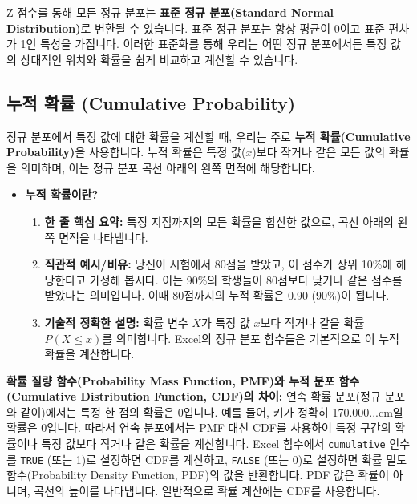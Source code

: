 \documentclass[11pt,a4paper]{book}
\theoremstyle{definition}
\begin{document}
Z-점수를 통해 모든 정규 분포는 \textbf{표준 정규 분포(Standard Normal Distribution)}로 변환될 수 있습니다.
표준 정규 분포는 항상 평균이 0이고 표준 편차가 1인 특성을 가집니다.
이러한 표준화를 통해 우리는 어떤 정규 분포에서든 특정 값의 상대적인 위치와 확률을 쉽게 비교하고 계산할 수 있습니다.

\subsection{누적 확률 (Cumulative Probability)}
정규 분포에서 특정 값에 대한 확률을 계산할 때, 우리는 주로 \textbf{누적 확률(Cumulative Probability)}을 사용합니다.
누적 확률은 특정 값($x$)보다 작거나 같은 모든 값의 확률을 의미하며, 이는 정규 분포 곡선 아래의 왼쪽 면적에 해당합니다.

\begin{itemize}
    \item \textbf{누적 확률이란?}
    \begin{enumerate}
        \item \textbf{한 줄 핵심 요약:} 특정 지점까지의 모든 확률을 합산한 값으로, 곡선 아래의 왼쪽 면적을 나타냅니다.
        \item \textbf{직관적 예시/비유:} 당신이 시험에서 80점을 받았고, 이 점수가 상위 10\%에 해당한다고 가정해 봅시다. 이는 90\%의 학생들이 80점보다 낮거나 같은 점수를 받았다는 의미입니다. 이때 80점까지의 누적 확률은 0.90 (90\%)이 됩니다.
        \item \textbf{기술적 정확한 설명:} 확률 변수 $X$가 특정 값 $x$보다 작거나 같을 확률 $P(X \le x)$를 의미합니다. Excel의 정규 분포 함수들은 기본적으로 이 누적 확률을 계산합니다.
    \end{enumerate}
\end{itemize}

\begin{cautionbox}
    \textbf{확률 질량 함수(Probability Mass Function, PMF)와 누적 분포 함수(Cumulative Distribution Function, CDF)의 차이:}
    연속 확률 분포(정규 분포와 같이)에서는 특정 한 점의 확률은 0입니다. 예를 들어, 키가 정확히 170.000...cm일 확률은 0입니다. 따라서 연속 분포에서는 PMF 대신 CDF를 사용하여 특정 구간의 확률이나 특정 값보다 작거나 같은 확률을 계산합니다. Excel 함수에서 \texttt{cumulative} 인수를 \texttt{TRUE} (또는 1)로 설정하면 CDF를 계산하고, \texttt{FALSE} (또는 0)로 설정하면 확률 밀도 함수(Probability Density Function, PDF)의 값을 반환합니다. PDF 값은 확률이 아니며, 곡선의 높이를 나타냅니다. 일반적으로 확률 계산에는 CDF를 사용합니다.
\end{cautionbox}
\end{document}
